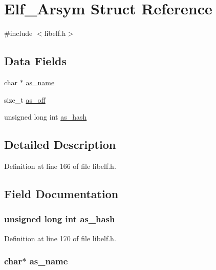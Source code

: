 \hypertarget{struct_elf___arsym}{\section{\-Elf\-\_\-\-Arsym \-Struct \-Reference}
\label{struct_elf___arsym}
}


{\ttfamily \#include $<$libelf.\-h$>$}

\subsection*{\-Data \-Fields}
\begin{DoxyCompactItemize}
\item 
char $\ast$ \hyperlink{struct_elf___arsym_a35c1890c69705b745d1cfa9c921bd4d1}{as\-\_\-name}
\item 
size\-\_\-t \hyperlink{struct_elf___arsym_a4869060e98029b805d64f425d24edc70}{as\-\_\-off}
\item 
unsigned long int \hyperlink{struct_elf___arsym_af7d0db0f0081a1751409bd070853f2a9}{as\-\_\-hash}
\end{DoxyCompactItemize}


\subsection{\-Detailed \-Description}


\-Definition at line 166 of file libelf.\-h.



\subsection{\-Field \-Documentation}
\hypertarget{struct_elf___arsym_af7d0db0f0081a1751409bd070853f2a9}{
\subsubsection[{as\-\_\-hash}]{\setlength{\rightskip}{0pt plus 5cm}unsigned long int {\bf as\-\_\-hash}}}\label{struct_elf___arsym_af7d0db0f0081a1751409bd070853f2a9}


\-Definition at line 170 of file libelf.\-h.

\hypertarget{struct_elf___arsym_a35c1890c69705b745d1cfa9c921bd4d1}{
\subsubsection[{as\-\_\-name}]{\setlength{\rightskip}{0pt plus 5cm}char$\ast$ {\bf as\-\_\-name}}}\label{struct_elf___arsym_a35c1890c69705b745d1cfa9c921bd4d1}


